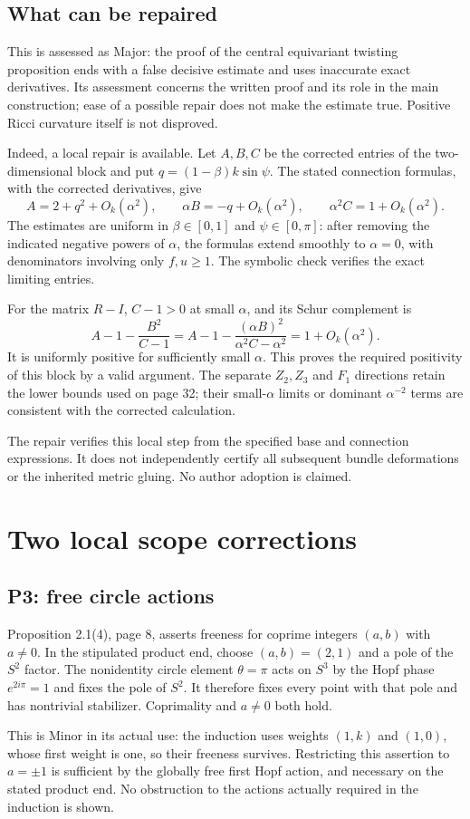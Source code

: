 \documentclass[10pt]{article}
\begin{document}
\subsection*{What can be repaired}
This is assessed as Major: the proof of the central equivariant twisting proposition ends with a false decisive estimate and uses inaccurate exact derivatives. Its assessment concerns the written proof and its role in the main construction; ease of a possible repair does not make the estimate true. Positive Ricci curvature itself is not disproved.\par
Indeed, a local repair is available. Let \(A,B,C\) be the corrected entries of the two-dimensional block and put \(q=(1-\beta)k\sin\psi\). The stated connection formulas, with the corrected derivatives, give \[A=2+q^2+O_k(\alpha^2),\qquad
\alpha B=-q+O_k(\alpha^2),\qquad
\alpha^2C=1+O_k(\alpha^2).\] The estimates are uniform in \(\beta\in[0,1]\) and \(\psi\in[0,\pi]\): after removing the indicated negative powers of \(\alpha\), the formulas extend smoothly to \(\alpha=0\), with denominators involving only \(f,u\geq1\). The symbolic check verifies the exact limiting entries.\par
For the matrix \(R-I\), \(C-1>0\) at small \(\alpha\), and its Schur complement is \[A-1-\frac{B^2}{C-1}
=A-1-\frac{(\alpha B)^2}{\alpha^2C-\alpha^2}
=1+O_k(\alpha^2).\] It is uniformly positive for sufficiently small \(\alpha\). This proves the required positivity of this block by a valid argument. The separate \(Z_2,Z_3\) and \(F_1\) directions retain the lower bounds used on page 32; their small-\(\alpha\) limits or dominant \(\alpha^{-2}\) terms are consistent with the corrected calculation.\par
The repair verifies this local step from the specified base and connection expressions. It does not independently certify all subsequent bundle deformations or the inherited metric gluing. No author adoption is claimed.\par
\section*{Two local scope corrections}
\subsection*{P3: free circle actions}
Proposition 2.1(4), page 8, asserts freeness for coprime integers \((a,b)\) with \(a\ne0\). In the stipulated product end, choose \((a,b)=(2,1)\) and a pole of the \(S^2\) factor. The nonidentity circle element \(\theta=\pi\) acts on \(S^3\) by the Hopf phase \(e^{2i\pi}=1\) and fixes the pole of \(S^2\). It therefore fixes every point with that pole and has nontrivial stabilizer. Coprimality and \(a\ne0\) both hold.\par
This is Minor in its actual use: the induction uses weights \((1,k)\) and \((1,0)\), whose first weight is one, so their freeness survives. Restricting this assertion to \(a=\pm1\) is sufficient by the globally free first Hopf action, and necessary on the stated product end. No obstruction to the actions actually required in the induction is shown.\par
\end{document}
